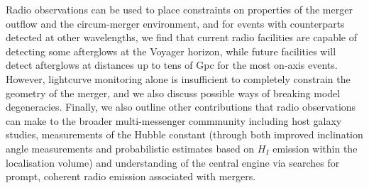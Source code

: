 Radio observations can be used to place constraints on properties of the merger outflow and the circum-merger environment, and for events with counterparts detected at other wavelengths, we find that current radio facilities are capable of detecting some afterglows at the Voyager horizon, while future facilities will detect afterglows at distances up to tens of Gpc for the most on-axis events. However, lightcurve monitoring alone is insufficient to completely constrain the geometry of the merger, and we also discuss possible ways of breaking model degeneracies. Finally, we also outline other contributions that radio observations can make to the broader multi-messenger commmunity including host galaxy studies, measurements of the Hubble constant (through both improved inclination angle measurements and probabilistic estimates based on $H_I$ emission within the localisation volume) and understanding of the central engine via searches for prompt, coherent radio emission associated with mergers.